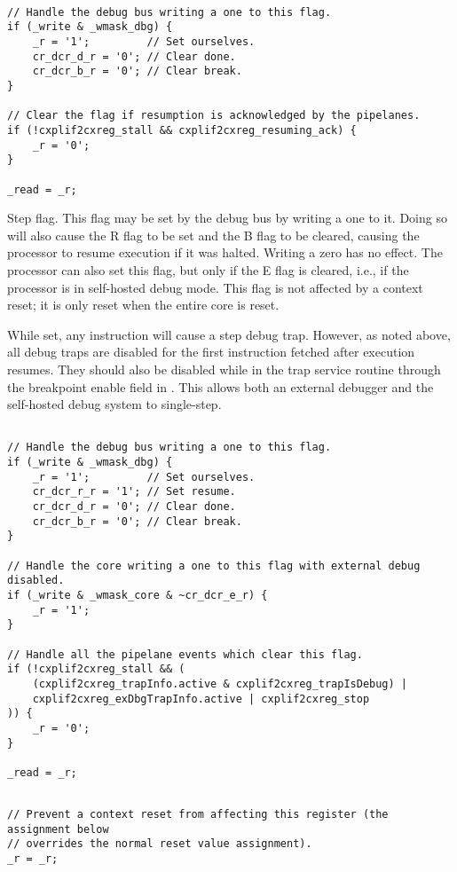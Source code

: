 \declaration{}
\implementation{}
\begin{lstlisting}

// Handle the debug bus writing a one to this flag.
if (_write & _wmask_dbg) {
    _r = '1';         // Set ourselves.
    cr_dcr_d_r = '0'; // Clear done.
    cr_dcr_b_r = '0'; // Clear break.
}

// Clear the flag if resumption is acknowledged by the pipelanes.
if (!cxplif2cxreg_stall && cxplif2cxreg_resuming_ack) {
    _r = '0';
}

_read = _r;
\end{lstlisting}

Step flag. This flag may be set by the debug bus by writing a one to it. Doing
so will also cause the R flag to be set and the B flag to be cleared, causing
the processor to resume execution if it was halted. Writing a zero has no
effect. The processor can also set this flag, but only if the E flag is cleared,
i.e., if the processor is in self-hosted debug mode. This flag is not affected 
by a context reset; it is only reset when the entire core is reset.

While set, any instruction will cause a step debug trap. However, as noted
above, all debug traps are disabled for the first instruction fetched after
execution resumes. They should also be disabled while in the trap service
routine through the breakpoint enable field in . This allows both an
external debugger and the self-hosted debug system to single-step.

\declaration{}
\implementation{}
\begin{lstlisting}

// Handle the debug bus writing a one to this flag.
if (_write & _wmask_dbg) {
    _r = '1';         // Set ourselves.
    cr_dcr_r_r = '1'; // Set resume.
    cr_dcr_d_r = '0'; // Clear done.
    cr_dcr_b_r = '0'; // Clear break.
}

// Handle the core writing a one to this flag with external debug disabled.
if (_write & _wmask_core & ~cr_dcr_e_r) {
    _r = '1';
}

// Handle all the pipelane events which clear this flag.
if (!cxplif2cxreg_stall && (
    (cxplif2cxreg_trapInfo.active & cxplif2cxreg_trapIsDebug) |
    cxplif2cxreg_exDbgTrapInfo.active | cxplif2cxreg_stop
)) {
    _r = '0';
}

_read = _r;
\end{lstlisting}
\resetImplementation{}
\begin{lstlisting}

// Prevent a context reset from affecting this register (the assignment below
// overrides the normal reset value assignment).
_r = _r;

\end{lstlisting}

